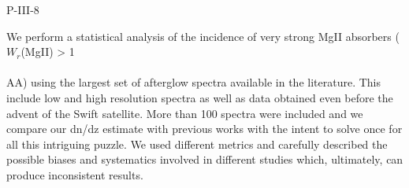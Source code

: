 P-III-8


\bigskip



\bigskip

\noindent We perform a statistical analysis of the incidence of very strong  MgII absorbers ($W_r$(MgII) > 1 \\\\AA) using the largest set of afterglow spectra available in the literature. This include low and high resolution spectra as well as data obtained even before the advent of the Swift satellite. More than 100 spectra were included and we compare our dn/dz estimate with previous works with the intent to solve once for all this intriguing puzzle. We used different metrics and  carefully described the possible biases and systematics involved in different studies which, ultimately, can produce inconsistent results.

